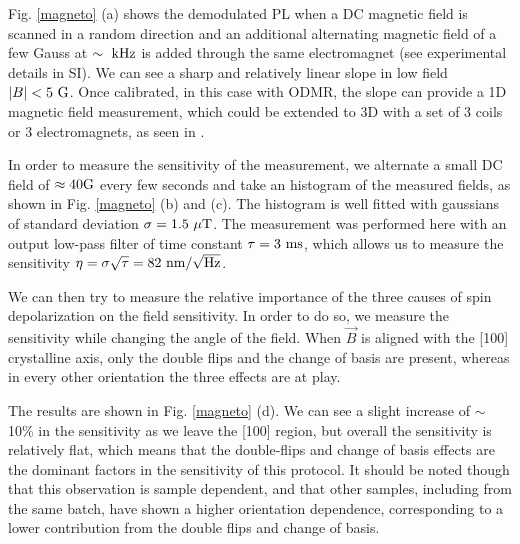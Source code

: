 \documentclass[preprintnumbers,amsmath,amssymb,superscriptaddress,twocolumn,showpacs]{revtex4-2}
\begin{document}
Fig. \ref{magneto} (a) shows the demodulated PL when a DC magnetic field is scanned in a random direction and an additional alternating magnetic field of a few Gauss at $\sim \ \rm kHz$ is added through the same electromagnet (see experimental details in SI). We can see a sharp and relatively linear slope in low field $\abs{B} < 5\ \rm G$. Once calibrated, in this case with ODMR, the slope can provide a 1D magnetic field measurement, which could be extended to 3D with a set of 3 coils or 3 electromagnets, as seen in \cite{zheng_microwave-free_2020}.

In order to measure the sensitivity of the measurement, we alternate a small DC field of $\approx 40 \rm G$ every few seconds and take an histogram of the measured fields, as shown in Fig. \ref{magneto} (b) and (c). The histogram is well fitted with gaussians of standard deviation $\sigma=1.5\ \mu \rm T$. The measurement was performed here with an output low-pass filter of time constant $\tau=3\ \rm ms$, which allows us to measure the sensitivity $\eta=\sigma \sqrt{\tau}=82\ \rm{nm}/\sqrt{\rm Hz}$.

We can then try to measure the relative importance of the three causes of spin depolarization on the field sensitivity. In order to do so, we measure the sensitivity while changing the angle of the field. When $\vec B$ is aligned with the [100] crystalline axis, only the double flips and the change of basis are present, whereas in every other orientation the three effects are at play.

The results are shown in Fig. \ref{magneto} (d). We can see a slight increase of $\sim$ 10\% in the sensitivity as we leave the [100] region, but overall the sensitivity is relatively flat, which means that the double-flips and change of basis effects are the dominant factors in the sensitivity of this protocol. %
It should be noted though that this observation is sample dependent, and that other samples, including from the same batch, have shown a higher orientation dependence, corresponding to a lower contribution from the double flips and change of basis.
\end{document}
